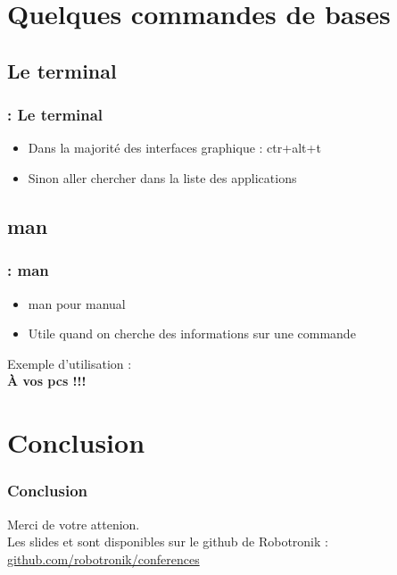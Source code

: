 \documentclass[13pt]{beamer}
\newenvironment{slide}[1]{
  \begin{frame}[environment=slide]
    \frametitle{\textbf{\insertsection}  : #1}}
{\end{frame}}
\begin{document}
\section{Quelques commandes de bases}

\subsection{Le terminal}
\begin{slide}{Le terminal}
  \begin{itemize}
  \item Dans la majorité des interfaces graphique : ctr+alt+t
  \item Sinon aller chercher dans la liste des applications
  \end{itemize}
\end{slide}

\subsection{man}

\begin{slide}{man}
  \begin{itemize}
  \item man pour manual
  \item Utile quand on cherche des informations sur une commande
  \end{itemize}
  \begin{center}
    \large{Exemple d'utilisation :\\
      \textbf{À vos pcs !!!}}
  \end{center}
\end{slide}


\section{Conclusion}

\begin{frame}
  \frametitle{\textbf{Conclusion}}
  Merci de votre attenion.\\
  \vspace*{1cm}
  Les slides et sont disponibles sur le github de Robotronik : \url{github.com/robotronik/conferences}
\end{frame}
\end{document}
